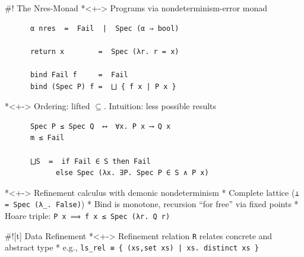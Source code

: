 \documentclass[fleqn]{beamer}
\newcommand{\is}{\lstinline[language=isabelle]}
\begin{document}

%
%

#! The Nres-Monad
  \small
  *<+-> Programs via nondeterminism-error monad
    \begin{lstlisting}
      α nres  =  Fail  |  Spec (α ⇒ bool)

      return x        =  Spec (λr. r = x)

      bind Fail f     =  Fail
      bind (Spec P) f =  ⨆ { f x | P x }
    \end{lstlisting}

  *<+-> Ordering: lifted $\subseteq$. Intuition: less possible results
    \begin{lstlisting}
      Spec P ≤ Spec Q  ⟷  ∀x. P x ⟶ Q x
      m ≤ Fail

      ⨆S  =  if Fail ∈ S then Fail
            else Spec (λx. ∃P. Spec P ∈ S ∧ P x)
    \end{lstlisting}

  *<+-> Refinement calculus with demonic nondeterminism
    * Complete lattice (\is{⊥ = Spec (λ_. False)})
    * Bind is monotone, recursion ``for free'' via fixed points
    * Hoare triple: \is{P x ⟹ f x ≤ Spec (λr. Q r)}

#![t] Data Refinement
  \small
  *<+-> Refinement relation \is{R} relates concrete and abstract type
    * e.g., \is$ls_rel ≡ { (xs,set xs) | xs. distinct xs }$
\end{document}
